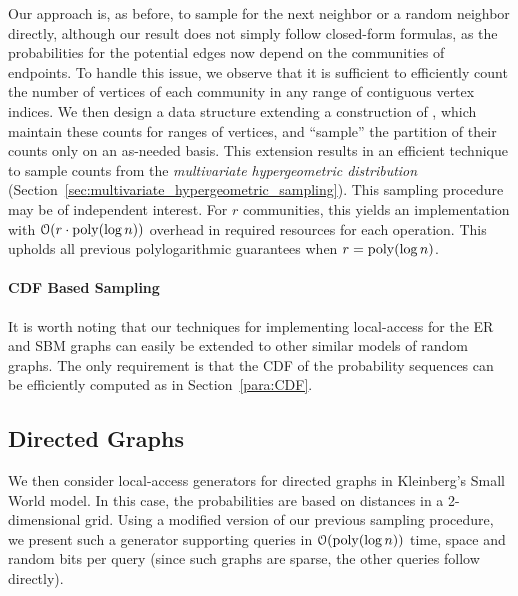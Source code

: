 Our approach is, as before, to sample for the next neighbor or a random neighbor directly,
although our result does not simply follow closed-form formulas,
as the probabilities for the potential edges now depend
on the communities of endpoints.
To handle this issue, we observe that it is sufficient to efficiently count
the number of vertices of each community in any
range of contiguous vertex indices.
We then design a data structure extending a construction of \cite{huge},
which maintain these counts for ranges of vertices,
and ``sample'' the partition of their counts only on an as-needed basis.
This extension results in an efficient technique to sample counts
from the \emph{multivariate hypergeometric distribution} (Section~\ref{sec:multivariate_hypergeometric_sampling}).
This sampling procedure may be of independent interest.
For $r$ communities, this yields an implementation with
$ \mathcal{O}(r\cdot \mathrm{poly}(\log n))$ overhead in required resources for each operation.
This upholds all previous polylogarithmic guarantees when $r = \mathrm{poly}(\log n)$.

\paragraph*{CDF Based Sampling}
It is worth noting that our techniques for implementing local-access for the ER and SBM graphs
can easily be extended to other similar models of random graphs.
The only requirement is that the CDF of the probability sequences can be efficiently computed as in Section~\ref{para:CDF}.





\subsection{Directed Graphs}
\label{sec:directed_graphs}
We then consider local-access generators for directed graphs in Kleinberg's Small World model.
In this case, the probabilities are based on distances in a 2-dimensional grid.
Using a modified version of our previous sampling procedure, we present such a generator supporting  queries in
$\mathcal{O}(\mathrm{poly}(\log n))$ time, space and random bits per query (since such graphs are sparse, the other queries follow directly).


